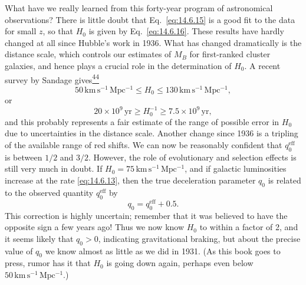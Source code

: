 What have we really learned from this forty-year program of astronomical
observations? There is little doubt that Eq.~\eqref{eq:14.6.15} is a good
fit to the data for small \(z\), so that \(H_0\) is given by
Eq.~\eqref{eq:14.6.16}. These results have hardly changed at all since
Hubble's work in 1936. What has changed dramatically is the distance scale,
which controls our estimates of \(M_B\) for first-ranked cluster galaxies,
and hence plays a crucial role in the determination of \(H_0\). A recent
survey by Sandage gives\hyperref[ch14-ref-44]{\textsuperscript{44}}
\[
  50\,\mathrm{km\,s^{-1}\,Mpc^{-1}}
  \leq H_0\leq
  130\,\mathrm{km\,s^{-1}\,Mpc^{-1}},
\]
or
\[
  20\times10^9\,\mathrm{yr}
  \geq H_0^{-1}\geq
  7.5\times10^9\,\mathrm{yr},
\]
and this probably represents a fair estimate of the range of possible error
in \(H_0\) due to uncertainties in the distance scale. Another change since
1936 is a tripling of the available range of red shifts. We can now be
reasonably confident that \(q_0^{\mathrm{eff}}\) is between \(1/2\) and
\(3/2\). However, the role of evolutionary and selection effects is still
very much in doubt. If
\(H_0=75\,\mathrm{km\,s^{-1}\,Mpc^{-1}}\), and if galactic luminosities
increase at the rate \eqref{eq:14.6.13}, then the true deceleration
parameter \(q_0\) is related to the observed quantity
\(q_0^{\mathrm{eff}}\) by
\[
  q_0=q_0^{\mathrm{eff}}+0.5.
\]
This correction is highly uncertain; remember that it was believed to have
the opposite sign a few years ago! Thus we now know \(H_0\) to within a
factor of 2, and it seems likely that \(q_0>0\), indicating gravitational
braking, but about the precise value of \(q_0\) we know almost as little as
we did in 1931. (As this book goes to press, rumor has it that \(H_0\) is
going down again, perhaps even below
\(50\,\mathrm{km\,s^{-1}\,Mpc^{-1}}\).)


